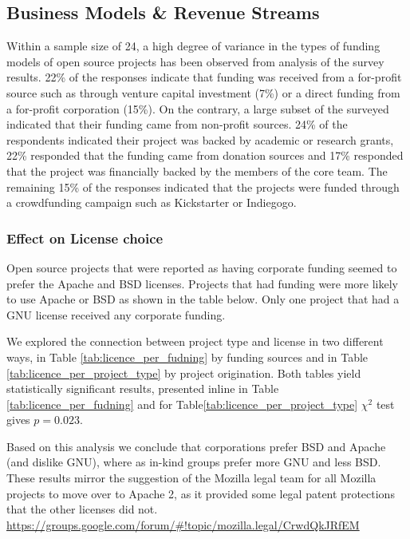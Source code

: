 \subsection{Business Models \& Revenue Streams}

Within a sample size of 24, a high degree of variance in the types of funding models of open source projects has been observed from analysis of the survey results. 22\% of the responses indicate that funding was received from a for-profit source such as through venture capital investment (7\%) or a direct funding from a for-profit corporation (15\%). On the contrary, a large subset of the surveyed indicated that their funding came from non-profit sources. 24\% of the respondents indicated their project was backed by academic or research grants, 22\% responded that the funding came from donation sources and 17\% responded that the project was financially backed by the members of the core team. The remaining 15\% of the responses indicated that the projects were funded through a crowdfunding campaign such as Kickstarter or Indiegogo.

\subsubsection{Effect on License choice}
Open source projects that were reported as having corporate funding seemed to prefer the Apache and BSD licenses. Projects that had funding were more likely to use Apache or BSD as shown in the table below. Only one project that had a GNU license received any corporate funding. 



We explored the connection between project type and license in two different ways, in Table \ref{tab:licence_per_fudning} by funding sources and in Table \ref{tab:licence_per_project_type} by project origination. Both tables yield statistically significant results, presented inline in Table \ref{tab:licence_per_fudning} and for Table\ref{tab:licence_per_project_type} $\chi^2$ test gives $p=0.023$.

Based on this analysis we conclude that corporations prefer BSD and Apache (and dislike GNU), where as in-kind groups prefer more GNU and less BSD. These results mirror the suggestion of the Mozilla legal team for all Mozilla projects to move over to Apache 2, as it provided some legal patent protections that the other licenses did not. \url{https://groups.google.com/forum/#!topic/mozilla.legal/CrwdQkJRfEM}

